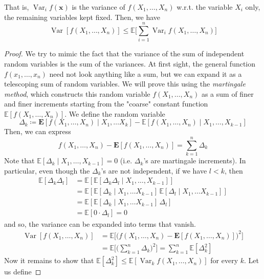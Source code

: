 \documentclass{article}
\DeclareMathOperator{\Var}{Var}
\begin{document}
  \begin{theorem}
  That is, $\Var_i f(\mathbf{x})$ is the variance of $f(X_1, \ldots, X_n)$ w.r.t. the variable $X_i$ only, the remaining variables kept fixed. Then, we have 
  \[\Var[f(X_1, \ldots, X_n)] \leq \mathbb{E} \bigg[ \sum_{i=1}^n \Var_i f(X_1, \ldots, X_n) \bigg] \]
  \end{theorem}
  \begin{proof}
  We try to mimic the fact that the variance of the sum of independent random variables is the sum of the variances. At first sight, the general function $f(x_1, \ldots, x_n)$ need not look anything like a sum, but we can expand it as a telescoping sum of random variables. We will prove this using the \textit{martingale method}, which constructs this random variable $f(X_1, \ldots, X_n)$ as a sum of finer and finer increments starting from the "coarse" constant function $\mathbb{E}[f(X_1, \ldots, X_n)]$. We define the random variable 
  \[\Delta_k \coloneqq \mathbf{E}[ f(X_1, \ldots, X_n) \mid X_1, \ldots X_k] - \mathbb{E}[ f(X_1, \ldots, X_n) \mid X_1, \ldots, X_{k-1}]\]
  Then, we can express 
  \[f( X_1, \ldots, X_n) - \mathbf{E}[ f(X_1, \ldots, X_n)] = \sum_{k=1}^n \Delta_k\]
  Note that $\mathbb{E}[\Delta_k \mid X_1, \ldots, X_{k-1}] = 0$ (i.e. $\Delta_k$'s are martingale increments). In particular, even though the $\Delta_k$'s are not independent, if we have $l < k$, then 
  \begin{align*}
      \mathbb{E}[ \Delta_k \Delta_l] & = \mathbb{E}[ \mathbb{E}[\Delta_k \Delta_l \mid X_1, \ldots, X_{k-1}]] \\
      & = \mathbb{E}[ \mathbb{E}[\Delta_k \mid X_1, \ldots X_{k-1} ] \, \mathbb{E}[\Delta_l \mid X_1, \ldots X_{k-1} ]] \\
      & = \mathbb{E}[ \mathbb{E}[\Delta_k \mid X_1, \ldots X_{k-1} ] \, \Delta_l] \\
      & = \mathbb{E}[0 \cdot \Delta_l] = 0
  \end{align*}
  and so, the variance can be expanded into terms that vanish. 
  \begin{align*}
      \Var[ f(X_1, \ldots, X_n)] & = \mathbb{E} \big[ \big( f( X_1, \ldots, X_n) - \mathbf{E}[ f(X_1, \ldots, X_n)] \big)^2\big] \\
      & = \mathbb{E} \bigg[ \bigg( \sum_{k=1}^n \Delta_k \bigg)^2 \bigg] = \sum_{k=1}^n \mathbb{E}[ \Delta_k^2]
  \end{align*}
  Now it remains to show that $\mathbb{E}[\Delta_k^2] \leq \mathbb{E}[\Var_k f(X_1, \ldots, X_n)]$ for every $k$. Let us define 

\end{proof}
\end{document}
